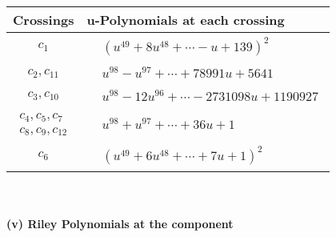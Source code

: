 \documentclass[1p]{elsarticle_modified}
\theoremstyle{definition}
\begin{document}
\begin{tabular}{m{50pt}|m{274pt}}
Crossings & \hspace{64pt}u-Polynomials at each crossing \\
\hline $$\begin{aligned}c_{1}\end{aligned}$$&$\begin{aligned}
&(u^{49}+8 u^{48}+\cdots- u+139)^{2}
\end{aligned}$\\
\hline $$\begin{aligned}c_{2},c_{11}\end{aligned}$$&$\begin{aligned}
&u^{98}- u^{97}+\cdots+78991 u+5641
\end{aligned}$\\
\hline $$\begin{aligned}c_{3},c_{10}\end{aligned}$$&$\begin{aligned}
&u^{98}-12 u^{96}+\cdots-2731098 u+1190927
\end{aligned}$\\
\hline $$\begin{aligned}c_{4},c_{5},c_{7}\\c_{8},c_{9},c_{12}\end{aligned}$$&$\begin{aligned}
&u^{98}+u^{97}+\cdots+36 u+1
\end{aligned}$\\
\hline $$\begin{aligned}c_{6}\end{aligned}$$&$\begin{aligned}
&(u^{49}+6 u^{48}+\cdots+7 u+1)^{2}
\end{aligned}$\\
\hline
\end{tabular}\\~\\
\newpage\renewcommand{\arraystretch}{1}
\flushleft \textbf{(v) Riley Polynomials at the component}\newline \\
\end{document}
